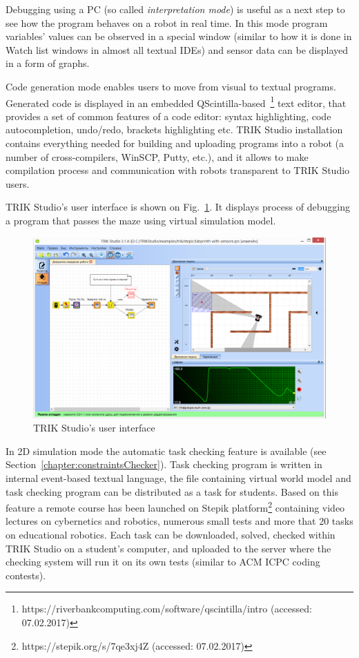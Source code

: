 \documentclass[conference]{IEEEtran}
\begin{document}
Debugging using a PC (so called \textit{interpretation mode}) is useful as a next step to see how the program behaves on a robot in real time. In this mode program variables' values can be observed in a special window (similar to how it is done in Watch list windows in almost all textual IDEs) and sensor data can be displayed in a form of graphs. 

Code generation mode enables users to move from visual to textual programs. Generated code is displayed in an embedded QScintilla-based~\footnote{https://riverbankcomputing.com/software/qscintilla/intro (accessed: 07.02.2017)} text editor, that provides a set of common features of a code editor: syntax highlighting, code autocompletion, undo/redo, brackets highlighting etc. TRIK Studio installation contains everything needed for building and uploading programs into a robot (a number of cross-compilers, WinSCP, Putty, etc.), and it allows to make compilation process and communication with robots transparent to TRIK Studio users.

TRIK Studio's user interface is shown on Fig.~\ref{image:TS_interface}. It displays process of debugging a program that passes the maze using virtual simulation model.

\begin{figure}[ht]
    \centering
    \includegraphics[width=\textwidth]{TS_CF_Labyrinth.png}
    \caption{TRIK Studio's user interface}
    \label{image:TS_interface}
\end{figure}

In 2D simulation mode the automatic task checking feature is available (see Section~\ref{chapter:constraintsChecker}). Task checking program is written in internal event-based textual language, the file containing virtual world model and task checking program can be distributed as a task for students. Based on this feature a remote course has been launched on Stepik platform\footnote{https://stepik.org/s/7qe3xj4Z (accessed: 07.02.2017)} containing video lectures on cybernetics and robotics, numerous small tests and more that 20 tasks on educational robotics. Each task can be downloaded, solved, checked within TRIK Studio on a student's computer, and uploaded to the server where the checking system will run it on its own tests (similar to ACM ICPC coding contests).
\end{document}
